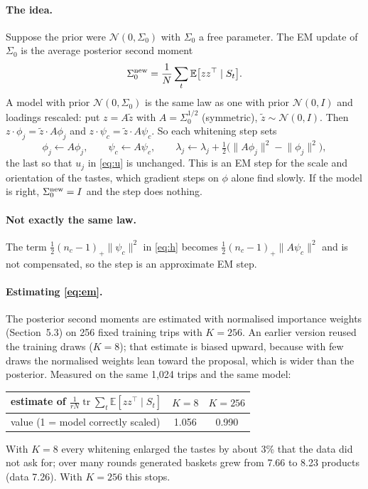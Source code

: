 \documentclass[11pt,a4paper]{article}
\theoremstyle{remark}
\newcommand{\N}{\mathcal N}
\newcommand{\E}{\mathbb E}
\newcommand{\pos}[1]{(#1)_+}
\begin{document}
\paragraph{The idea.} Suppose the prior were $\N(0,\Sigma_0)$ with $\Sigma_0$ a free parameter. The EM update
of $\Sigma_0$ is the average posterior second moment
\begin{equation}
\Sigma_0^{\rm new}=\frac1N\sum_t\E\big[z z^\top\mid S_t\big].
\label{eq:em}
\end{equation}
A model with prior $\N(0,\Sigma_0)$ is the same law as one with prior $\N(0,I)$ and loadings rescaled: put
$z=A\tilde z$ with $A=\Sigma_0^{1/2}$ (symmetric), $\tilde z\sim\N(0,I)$. Then $z\cdot\phi_j=\tilde z\cdot A\phi_j$ and
$z\cdot\psi_c=\tilde z\cdot A\psi_c$. So each whitening step sets
\[
\phi_j\leftarrow A\phi_j,\qquad\psi_c\leftarrow A\psi_c,\qquad
\lambda_j\leftarrow\lambda_j+\tfrac12\big(\lVert A\phi_j\rVert^2-\lVert\phi_j\rVert^2\big),
\]
the last so that $u_j$ in \eqref{eq:u} is unchanged. This is an EM step for the scale and orientation of the
tastes, which gradient steps on $\phi$ alone find slowly. If the model is right, $\Sigma_0^{\rm new}=I$ and the step
does nothing.

\paragraph{Not exactly the same law.} The term $\tfrac12\pos{n_c-1}\lVert\psi_c\rVert^2$ in \eqref{eq:h} becomes
$\tfrac12\pos{n_c-1}\lVert A\psi_c\rVert^2$ and is not compensated, so the step is an approximate EM step.

\paragraph{Estimating \eqref{eq:em}.} The posterior second moments are estimated with normalised importance
weights (Section~5.3) on 256 fixed training trips with $K=256$. An earlier version reused the training
draws ($K=8$); that estimate is biased upward, because with few draws the normalised weights lean toward the
proposal, which is wider than the posterior. Measured on the same 1{,}024 trips and the same model:
\begin{center}\small
\begin{tabular}{lcc}\toprule
estimate of $\frac1{rN}\operatorname{tr}\sum_t\E[zz^\top\mid S_t]$ & $K=8$ & $K=256$\\\midrule
value (1 = model correctly scaled) & 1.056 & 0.990\\\bottomrule
\end{tabular}
\end{center}
With $K=8$ every whitening enlarged the tastes by about 3\% that the data did not ask for; over many rounds
generated baskets grew from 7.66 to 8.23 products (data 7.26). With $K=256$ this stops.
\end{document}
